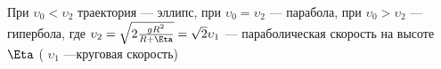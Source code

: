 При $\upsilon_0<\upsilon_2$ траектория --- эллипс, при $\upsilon_0=\upsilon_2$ --- парабола, при $\upsilon_0>\upsilon_2$ --- гипербола,
где $\upsilon_2=\sqrt{2\tfrac{gR^2}{R+\Eta}}=\sqrt{2}\upsilon_1$ --- параболическая скорость на высоте $\Eta$ ( $\upsilon_1$ ---круговая
скорость)
